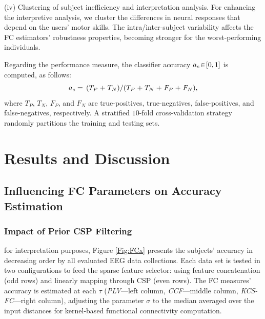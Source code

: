 ({iv}) Clustering of subject inefficiency and interpretation analysis. 
For enhancing the interpretive analysis, we cluster the differences in neural responses that depend on the users' motor skills. The intra/inter-subject variability affects the FC estimators' robustness properties, becoming stronger for the worst-performing individuals.

{Regarding the performance measure, the classifier accuracy $a_c\negthinspace\in\negthinspace[0,1]$ is computed, as follows:
$$a_c= \,(T_P \s{~+~} T_N )/ (T_P\s{~+~} T_N \s{~+~} F_P \s{~+~} F_N ),$$
 where $T_P$, $T_N$, $F_P$, and $F_N$ are true-positives, true-negatives, false-positives, and false-negatives, respectively. A stratified $10$-fold cross-validation strategy randomly partitions the training and testing sets.}

\section{Results and Discussion}

\subsection{Influencing FC Parameters on Accuracy Estimation}

\subsubsection{Impact of Prior CSP Filtering}

{for interpretation purposes, Figure \ref{Fig:FCx} presents the subjects' accuracy in decreasing order by all evaluated EEG data collections. Each data set is tested in two configurations to feed the sparse feature selector: using feature concatenation (odd rows) and linearly mapping through CSP (even rows). The FC measures' accuracy is estimated at each $\tau$ (\textit{PLV}---left column, \textit{CCF}---middle column, \textit{KCS-FC}---right column), adjusting the parameter $\sigma$ to the median averaged over the input distances for kernel-based functional connectivity computation.} 

